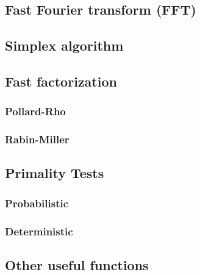\documentclass[10pt]{extarticle}
\begin{document}
\begin{multicols*}{3}
\subsection{Fast Fourier transform (FFT)} %


\subsection{Simplex algorithm} %


\subsection{Fast factorization} %

\subsubsection{Pollard-Rho}


\subsubsection{Rabin-Miller}


\subsection{Primality Tests} %

\subsubsection{Probabilistic}


\subsubsection{Deterministic}


\subsection{Other useful functions} %



\end{multicols*}
\end{document}
